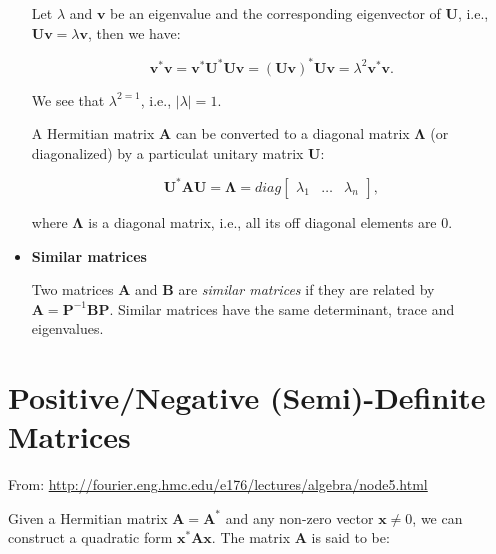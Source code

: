 \documentclass[10pt,b5paper,titlepage]{book}
\begin{document}
\begin{itemize}
        Let $\lambda$ and $\mathbf{v}$ be an eigenvalue and the corresponding
        eigenvector of $\mathbf{U}$, i.e., $\mathbf{U}\mathbf{v} = \lambda\mathbf{v}$,
        then we have:

        \begin{equation}
            \mathbf{v}^{*}\mathbf{v}
            = \mathbf{v}^{*}\mathbf{U}^{*}\mathbf{U}\mathbf{v}
            = (\mathbf{U}\mathbf{v})^{*}\mathbf{U}\mathbf{v}
            = \lambda^{2}\mathbf{v}^{*}\mathbf{v}
        .\end{equation}

        We see that $\lambda^{2 = 1}$, i.e., $|\lambda| = 1$.

        A Hermitian matrix $\mathbf{A}$ can be converted to a diagonal
        matrix $\mathbf{\Lambda}$ (or diagonalized) by a particulat unitary
        matrix $\mathbf{U}$:

        \begin{equation}
            \mathbf{U}^{*}\mathbf{A}\mathbf{U} = \mathbf{\Lambda}
            = diag \begin{bmatrix} \lambda_1 & \ldots & \lambda_n \end{bmatrix}
        ,\end{equation}

        where $\mathbf{\Lambda}$ is a diagonal matrix, i.e., all its off diagonal
        elements are 0.

    \item \textbf{Similar matrices}

        Two matrices $\mathbf{A}$ and $\mathbf{B}$ are \textit{similar matrices}
        if they are related by $\mathbf{A} = \mathbf{P}^{-1}\mathbf{B}\mathbf{P}$.
        Similar matrices have the same determinant, trace and eigenvalues.

\end{itemize}



\chapter{Positive/Negative (Semi)-Definite Matrices}

From: \url{http://fourier.eng.hmc.edu/e176/lectures/algebra/node5.html}

Given a Hermitian matrix $\mathbf{A} = \mathbf{A}^{*}$ and any non-zero
vector $\mathbf{x} \neq 0$, we can construct a quadratic form
$\mathbf{x}^{*}\mathbf{A}\mathbf{x}$. The matrix $\mathbf{A}$ is said to be:
\end{document}
